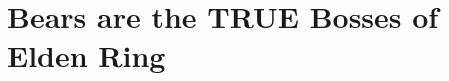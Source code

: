\chapter{Bears are the TRUE Bosses of Elden Ring}

\newcommand\IIISiofraEnv{4}
\newcommand\IIISiofraMobs{11}
\newcommand\IIISiofraStag{1}
\newcommand\IIISiofra{
    \the\numexpr
    \IIISiofraEnv
    + \IIISiofraMobs
    + \IIISiofraStag
    \relax
}

\newcommand\IIICaelidMobs{19}
\newcommand\IIICaelid{
    \the\numexpr
    \IIICaelidMobs
    \relax
}

\newcommand\IIIMorneMobs{1}
\newcommand\IIIMorneEnv{1}
\newcommand\IIIMorne{
    \the\numexpr
    \IIIMorneMobs
    + \IIIMorneEnv
    \relax
}

\newcommand\IIIEnvDeaths{
    \the\numexpr
    \IIISiofraEnv
    + \IIIMorneEnv
    \relax
}
\newcommand\IIIMobDeaths{
    \the\numexpr
    \IIISiofraMobs
    + \IIICaelidMobs
    + \IIIMorneMobs
    \relax
}
\newcommand\IIIBossDeaths{
    \the\numexpr
    \IIISiofraStag
    \relax
}
\newcommand\IIIDeaths{
    \the\numexpr
    \IIIEnvDeaths +
    \IIIMobDeaths +
    \IIIBossDeaths
    \relax
}

